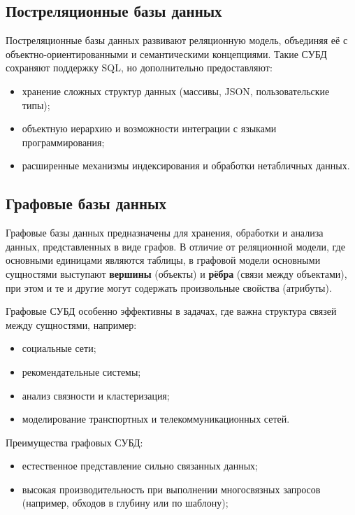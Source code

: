 \subsection{Постреляционные базы данных}

Постреляционные базы данных развивают реляционную модель, объединяя её с объектно-ориентированными и семантическими концепциями. Такие СУБД сохраняют поддержку SQL, но дополнительно предоставляют:

\begin{itemize}
    \item хранение сложных структур данных (массивы, JSON, пользовательские типы);
    \item объектную иерархию и возможности интеграции с языками программирования;
    \item расширенные механизмы индексирования и обработки нетабличных данных.
\end{itemize}

\subsection{Графовые базы данных}

Графовые базы данных предназначены для хранения, обработки и анализа данных, представленных в виде графов. В отличие от реляционной модели, где основными единицами являются таблицы, в графовой модели основными сущностями выступают \textbf{вершины} (объекты) и \textbf{рёбра} (связи между объектами), при этом и те и другие могут содержать произвольные свойства (атрибуты).

Графовые СУБД особенно эффективны в задачах, где важна структура связей между сущностями, например:
\begin{itemize}
    \item социальные сети;
    \item рекомендательные системы;
    \item анализ связности и кластеризация;
    \item моделирование транспортных и телекоммуникационных сетей.
\end{itemize}

Преимущества графовых СУБД:
\begin{itemize}
    \item естественное представление сильно связанных данных;
    \item высокая производительность при выполнении многосвязных запросов (например, обходов в глубину или по шаблону);
\end{itemize}

